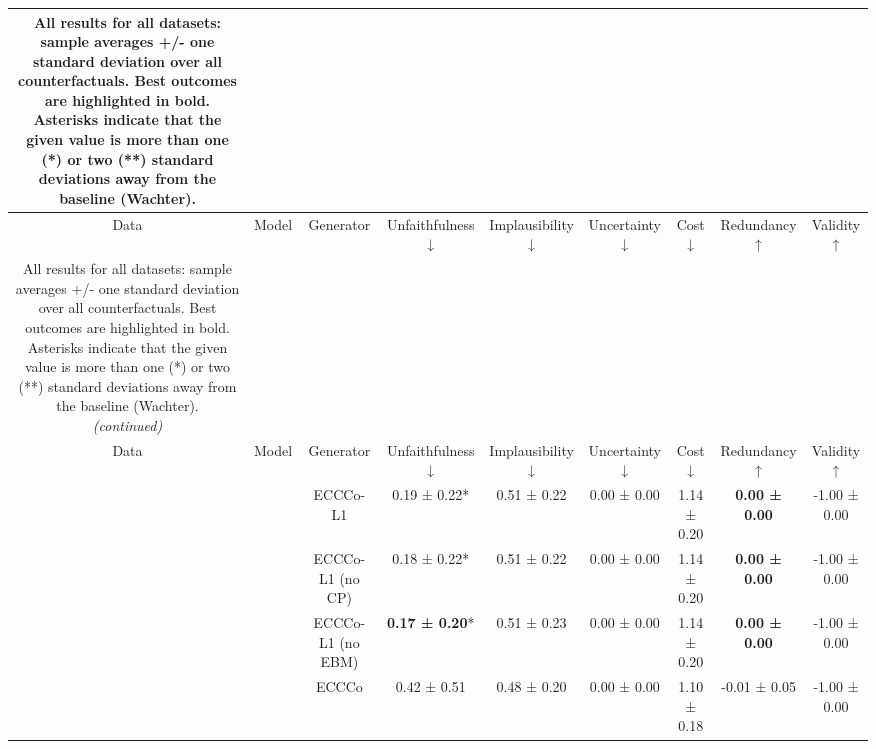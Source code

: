 
\begin{longtable}[t]{ccccccccc}
\caption{All results for all datasets: sample averages +/- one standard deviation over all counterfactuals. Best outcomes are highlighted in bold. Asterisks indicate that the given value is more than one (*) or two (**) standard deviations away from the baseline (Wachter). \label{tab:results-full} \newline}\\
\toprule
Data & Model & Generator & Unfaithfulness ↓ & Implausibility ↓ & Uncertainty ↓ & Cost ↓ & Redundancy ↑ & Validity ↑\\
\midrule
\endfirsthead
\caption[]{All results for all datasets: sample averages +/- one standard deviation over all counterfactuals. Best outcomes are highlighted in bold. Asterisks indicate that the given value is more than one (*) or two (**) standard deviations away from the baseline (Wachter).  \newline \textit{(continued)}}\\
\toprule
Data & Model & Generator & Unfaithfulness ↓ & Implausibility ↓ & Uncertainty ↓ & Cost ↓ & Redundancy ↑ & Validity ↑\\
\midrule
\endhead

\endfoot
\bottomrule
\endlastfoot
 &  & ECCCo-L1 & 0.19 ± 0.22*\hphantom{*} & 0.51 ± 0.22\hphantom{*}\hphantom{*} & 0.00 ± 0.00\hphantom{*}\hphantom{*} & 1.14 ± 0.20\hphantom{*}\hphantom{*} & \textbf{0.00 ± 0.00}\hphantom{*}\hphantom{*} & -1.00 ± 0.00\hphantom{*}\hphantom{*}\\

 &  & ECCCo-L1 (no CP) & 0.18 ± 0.22*\hphantom{*} & 0.51 ± 0.22\hphantom{*}\hphantom{*} & 0.00 ± 0.00\hphantom{*}\hphantom{*} & 1.14 ± 0.20\hphantom{*}\hphantom{*} & \textbf{0.00 ± 0.00}\hphantom{*}\hphantom{*} & -1.00 ± 0.00\hphantom{*}\hphantom{*}\\

 &  & ECCCo-L1 (no EBM) & \textbf{0.17 ± 0.20}*\hphantom{*} & 0.51 ± 0.23\hphantom{*}\hphantom{*} & 0.00 ± 0.00\hphantom{*}\hphantom{*} & 1.14 ± 0.20\hphantom{*}\hphantom{*} & \textbf{0.00 ± 0.00}\hphantom{*}\hphantom{*} & -1.00 ± 0.00\hphantom{*}\hphantom{*}\\

 &  & ECCCo & 0.42 ± 0.51\hphantom{*}\hphantom{*} & 0.48 ± 0.20\hphantom{*}\hphantom{*} & 0.00 ± 0.00\hphantom{*}\hphantom{*} & 1.10 ± 0.18\hphantom{*}\hphantom{*} & -0.01 ± 0.05\hphantom{*}\hphantom{*} & -1.00 ± 0.00\hphantom{*}\hphantom{*}\\


\end{longtable}
